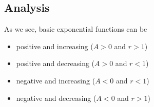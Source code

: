 \documentclass{ximera}
\begin{document}
\subsection*{Analysis}

As we see, basic exponential functions can be

\begin{itemize}
\item positive and increasing ($A>0$ and $r>1$)
\item positive and decreasing ($A>0$ and $r<1$)
\item negative and increasing ($A<0$ and $r<1$)
\item negative and decreasing ($A<0$ and $r>1$)
\end{itemize}
\end{document}
